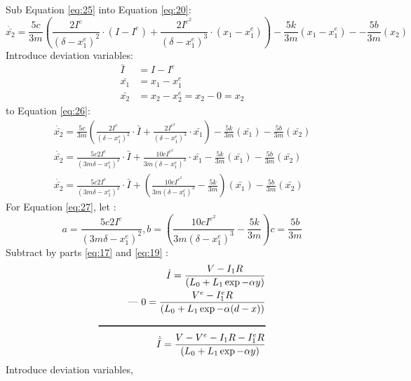     Sub Equation \eqref{eq:25} into Equation \eqref{eq:20}:
    \begin{equation}
         \dot{\bar{x_2}} = \frac{5c}{3m}\left( \frac{2I^e}{(\delta -{x_1^e})^2}\cdot (I - I^e) + \frac{2I^e^2}{(\delta -{x_1^e})^3}\cdot (x_1 - x_1^e)\right) - \frac{5k}{3m}(x_1 - x_1^e) - - \frac{5b}{3m}(x_2) \label{eq:26}
    \end{equation}
    Introduce deviation variables:
    \begin{align}
         \bar{I} &= I - I^e \nonumber\\
         \bar{x_1} &= x_1 - x_1^e \nonumber\\
         \bar{x_2} &= x_2 - x_2^e = x_2 - 0 = x_2 \nonumber
    \end{align}
    to Equation \eqref{eq:26}:
    \begin{align}
         \dot{\bar{x_2}} = \frac{5c}{3m}\left( \frac{2I^e}{(\delta -{x_1^e})^2}\cdot \bar{I} + \frac{2I^e^2}{(\delta -{x_1^e})^3}\cdot \bar{x_1}\right) - \frac{5k}{3m}(\bar{x_1}) - \frac{5b}{3m}(\bar{x_2}) \nonumber \\
         \dot{\bar{x_2}} =\frac{5c2I^e}{(3m\delta -{x_1^e})^2}\cdot \bar{I} + \frac{10cI^e^2}{3m(\delta -{x_1^e})^3}\cdot \bar{x_1} - \frac{5k}{3m}(\bar{x_1}) - \frac{5b}{3m}(\bar{x_2}) \nonumber \\
         \dot{\bar{x_2}} =\frac{5c2I^e}{(3m\delta -{x_1^e})^2}\cdot \bar{I} + \left(\frac{10cI^e^2}{3m(\delta -{x_1^e})^3} - \frac{5k}{3m}\right)(\bar{x_1}) - \frac{5b}{3m}(\bar{x_2}) \label{eq:27} 
    \end{align}
    For Equation \eqref{eq:27}, let :
    \begin{equation}
         a =\frac{5c2I^e}{(3m\delta -{x_1^e})^2}, b = \left(\frac{10cI^e^2}{3m(\delta -{x_1^e})^3} - \frac{5k}{3m}\right) c = \frac{5b}{3m} \nonumber
    \end{equation}
    Subtract by parts \eqref{eq:17} and \eqref{eq:19} :
    \begin{align}
        {\dot{I}} = \frac{V - {I_1}R}{\left(L_{0} + L_{1}\exp{- \alpha y}\right)}\nonumber\\ 
        \text{--- }  0 = \frac{V^e - {I_1^e}R}{\left(L_{0} + L_{1}\exp{- \alpha (d - x)}\right)} \nonumber \\
        \rule{6cm}{1pt} \nonumber \\
        {\dot{\bar{I}}} = \frac{V - V^e - {I_1}R- {I_1^e}R}{\left(L_{0} + L_{1}\exp{- \alpha y}\right)}\label{eq:28}
    \end{align}
    Introduce deviation variables,
